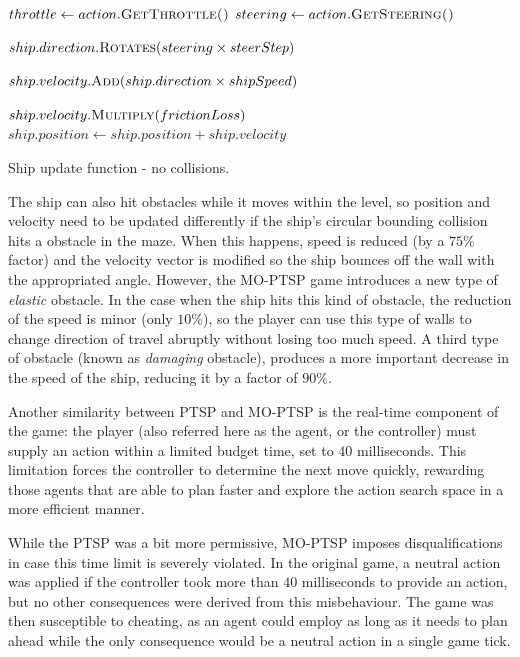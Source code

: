\documentclass[conference]{IEEEtran}
\begin{document}
\begin{algorithm}[!h]
\begin{algorithmic}
	\State $throttle \gets action.\Call{GetThrottle()}{}$
	\State $steering \gets action.\Call{GetSteering()}{}$

	\State $ship.direction.\Call{Rotates}{steering \times steerStep}$

		\State $ship.velocity.\Call{Add}{ship.direction \times shipSpeed}$
	\EndIf

	\State $ship.velocity.\Call{Multiply}{frictionLoss}$
	\State $ship.position \gets ship.position + ship.velocity$


\EndFunction
\end{algorithmic}
\caption{Ship update function - no collisions.}
\label{alg:shipUpadte}
\end{algorithm}

The ship can also hit obstacles while it moves within the level, so position and velocity need to be updated differently if the ship's circular bounding collision hits a obstacle in the maze. When this happens, speed is reduced (by a $75\%$ factor) and the velocity vector is modified so the ship bounces off the wall with the appropriated angle. However, the MO-PTSP game introduces a new type of \textit{elastic} obstacle. In the case when the ship hits this kind of obstacle, the reduction of the speed is minor (only $10\%$), so the player can use this type of walls to change direction of travel abruptly without losing too much speed. A third type of obstacle (known as \textit{damaging} obstacle), produces a more important decrease in the speed of the ship, reducing it by a factor of $90\%$.

Another similarity between PTSP and MO-PTSP is the real-time component of the game: the player (also referred here as the agent, or the controller) must supply an action within a limited budget time, set to $40$ milliseconds. This limitation forces the controller to determine the next move quickly, rewarding those agents that are able to plan faster and explore the action search space in a more efficient manner.

While the PTSP was a bit more permissive, MO-PTSP imposes disqualifications in case this time limit is severely violated. In the original game, a neutral action was applied if the controller took more than $40$ milliseconds to provide an action, but no other consequences were derived from this misbehaviour. The game was then susceptible to cheating, as an agent could employ as long as it needs to plan ahead while the only consequence would be a neutral action in a single game tick. 
\end{document}
